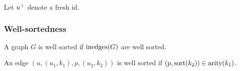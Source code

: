 

Let ${u}^{+}$ denote a fresh id.


\subsubsection{Well-sortedness}

\begin{definition}
  A graph $G$ is well sorted if $\text{inedges}\mathopen{}\left(G\right)\mathclose{}$ are well sorted.
\end{definition}

\begin{definition}
  An edge $(u, (u_1, k_1), p, (u_2, k_2))$ is well sorted if $(p, \operatorname{\text{sort}}\mathopen{}\left(k_2\right)\mathclose{}) \in \operatorname{\text{arity}}\mathopen{}\left(k_1\right)\mathclose{}$.
\end{definition}

